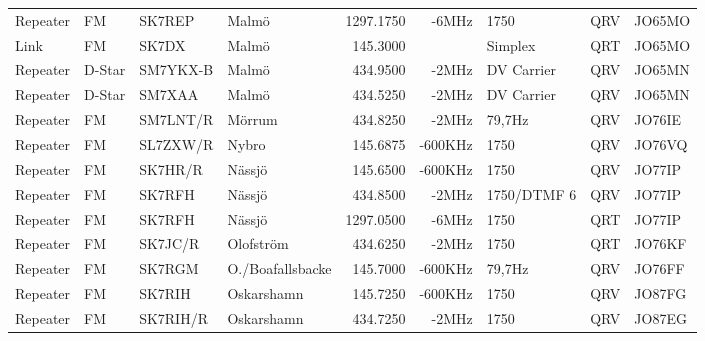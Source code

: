 \begin{landscape}
\begin{longtable}{llllrrlcl}
	Repeater          & FM           & SK7REP        & Malmö               &         1297.1750 &          -6MHz & 1750            &       QRV       & JO65MO           \\
	Link              & FM           & SK7DX         & Malmö               &          145.3000 &                & Simplex         &       QRT       & JO65MO           \\
	Repeater          & D-Star       & SM7YKX-B      & Malmö               &          434.9500 &          -2MHz & DV Carrier      &       QRV       & JO65MN           \\
	Repeater          & D-Star       & SM7XAA        & Malmö               &          434.5250 &          -2MHz & DV Carrier      &       QRV       & JO65MN           \\
	Repeater          & FM           & SM7LNT/R      & Mörrum              &          434.8250 &          -2MHz & 79,7Hz          &       QRV       & JO76IE           \\
	Repeater          & FM           & SL7ZXW/R      & Nybro               &          145.6875 &        -600KHz & 1750            &       QRV       & JO76VQ           \\
	Repeater          & FM           & SK7HR/R       & Nässjö              &          145.6500 &        -600KHz & 1750            &       QRV       & JO77IP           \\
	Repeater          & FM           & SK7RFH        & Nässjö              &          434.8500 &          -2MHz & 1750/DTMF 6     &       QRV       & JO77IP           \\
	Repeater          & FM           & SK7RFH        & Nässjö              &         1297.0500 &          -6MHz & 1750            &       QRT       & JO77IP           \\
	Repeater          & FM           & SK7JC/R       & Olofström           &          434.6250 &          -2MHz & 1750            &       QRT       & JO76KF           \\
	Repeater          & FM           & SK7RGM        & O./Boafallsbacke    &          145.7000 &        -600KHz & 79,7Hz          &       QRV       & JO76FF           \\
	Repeater          & FM           & SK7RIH        & Oskarshamn          &          145.7250 &        -600KHz & 1750            &       QRV       & JO87FG           \\
	Repeater          & FM           & SK7RIH/R      & Oskarshamn          &          434.7250 &          -2MHz & 1750            &       QRV       & JO87EG           \\

\end{longtable}
\end{landscape}
